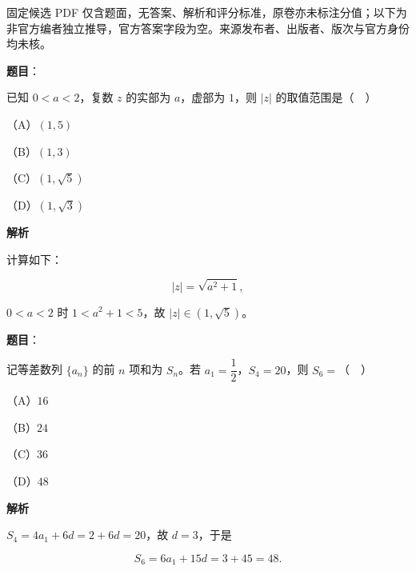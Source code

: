 

\begin{gktip}
固定候选 PDF 仅含题面，无答案、解析和评分标准，原卷亦未标注分值；以下为非官方编者独立推导，官方答案字段为空。来源发布者、出版者、版次与官方身份均未核。
\end{gktip}

\begin{answer}

\textbf{题目}：

已知 $0<a<2$，复数 $z$ 的实部为 $a$，虚部为 $1$，则 $|z|$ 的取值范围是（　）

（A）$(1,5)$

（B）$(1,3)$

（C）$(1,\sqrt5)$

（D）$(1,\sqrt3)$

\textbf{解析}

计算如下：

\nopagebreak[4]
\[|z|=\sqrt{a^2+1},\]

$0<a<2$ 时 $1<a^2+1<5$，故 $|z|\in(1,\sqrt5)$。


\end{answer}
\begin{answer}

\textbf{题目}：

记等差数列 $\{a_n\}$ 的前 $n$ 项和为 $S_n$。若 $a_1=\dfrac12$，$S_4=20$，则 $S_6=$（　）

（A）$16$

（B）$24$

（C）$36$

（D）$48$

\textbf{解析}

$S_4=4a_1+6d=2+6d=20$，故 $d=3$，于是

\nopagebreak[4]
\[S_6=6a_1+15d=3+45=48.\]


\end{answer}
